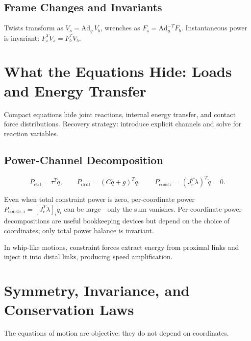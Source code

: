 \documentclass[11pt]{article}
\begin{document}
\subsection{Frame Changes and Invariants}

Twists transform as $V_s = \mathrm{Ad}_g\, V_b$, wrenches as $F_s = \mathrm{Ad}_g^{-T} F_b$. Instantaneous power is invariant: $F_s^T V_s = F_b^T V_b$.


\section{What the Equations Hide: Loads and Energy Transfer}\label{sec:hidden-loads}

Compact equations hide joint reactions, internal energy transfer, and contact force distributions. Recovery strategy: introduce explicit channels and solve for reaction variables.

\subsection{Power-Channel Decomposition}

\begin{equation}
P_{\mathrm{ctrl}}=\tau^T\dot{q}, \qquad
P_{\mathrm{drift}}=(C\dot{q}+g)^T\dot{q}, \qquad
P_{\mathrm{constr}}=(J_c^T\lambda)^T\dot{q}=0.
\end{equation}

Even when total constraint power is zero, per-coordinate power $P_{\mathrm{constr},i}=[J_c^T\lambda]_i\dot{q}_i$ can be large---only the sum vanishes. Per-coordinate power decompositions are useful bookkeeping devices but depend on the choice of coordinates; only total power balance is invariant.

In whip-like motions, constraint forces extract energy from proximal links and inject it into distal links, producing speed amplification.


\section{Symmetry, Invariance, and Conservation Laws}\label{sec:symmetry}

The equations of motion are objective: they do not depend on coordinates.
\end{document}
